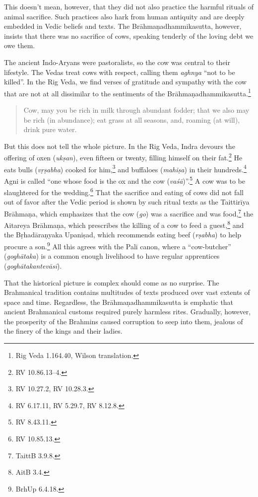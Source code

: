 \documentclass[12pt,openany]{book}%
\begin{document}
This doesn’t mean, however, that they did not also practice the harmful rituals of animal sacrifice. Such practices also hark from human antiquity and are deeply embedded in Vedic beliefs and texts. The \textsanskrit{Brāhmaṇadhammikasutta}, however, insists that there was no sacrifice of cows, speaking tenderly of the loving debt we owe them.

The ancient Indo-Aryans were pastoralists, so the cow was central to their lifestyle. The Vedas treat cows with respect, calling them \textit{aghnya} “not to be killed”. In the Rig Veda, we find verses of gratitude and sympathy with the cow that are not at all dissimilar to the sentiments of the \textsanskrit{Brāhmaṇadhammikasutta}.\footnote{Rig Veda 1.164.40, Wilson translation. }

\begin{quotation}%
Cow, may you be rich in milk through abundant fodder; that we also may be rich (in abundance); eat grass at all seasons, and, roaming (at will), drink pure water.

%
\end{quotation}

But this does not tell the whole picture. In the Rig Veda, Indra devours the offering of oxen (\textit{\textsanskrit{ukṣan}}), even fifteen or twenty, filling himself on their fat.\footnote{RV 10.86.13–4. } He eats bulls (\textit{\textsanskrit{vṛṣabha}}) cooked for him,\footnote{RV 10.27.2, RV 10.28.3. } and buffaloes (\textit{\textsanskrit{mahiṣa}}) in their hundreds.\footnote{RV 6.17.11, RV 5.29.7, RV 8.12.8. } Agni is called “one whose food is the ox and the cow (\textit{\textsanskrit{vaśā}})”.\footnote{RV 8.43.11. } A cow was to be slaughtered for the wedding.\footnote{RV 10.85.13. } That the sacrifice and eating of cows did not fall out of favor after the Vedic period is shown by such ritual texts as the \textsanskrit{Taittirīya} \textsanskrit{Brāhmaṇa}, which emphasizes that the cow (\textit{go}) was a sacrifice and was food,\footnote{TaittB 3.9.8. } the Aitareya \textsanskrit{Brāhmaṇa}, which prescribes the killing of a cow to feed a guest,\footnote{AitB 3.4. } and the \textsanskrit{Bṛhadāraṇyaka} \textsanskrit{Upaniṣad}, which recommends eating beef (\textit{\textsanskrit{rṣabha}}) to help procure a son.\footnote{BrhUp 6.4.18. } All this agrees with the Pali canon, where a “cow-butcher” (\textit{\textsanskrit{goghātaka}}) is a common enough livelihood to have regular apprentices (\textit{\textsanskrit{goghātakantevāsī}}).

That the historical picture is complex should come as no surprise. The Brahmanical tradition contains multitudes of texts produced over vast extents of space and time. Regardless, the \textsanskrit{Brāhmaṇadhammikasutta} is emphatic that ancient Brahmanical customs required purely harmless rites. Gradually, however, the prosperity of the Brahmins caused corruption to seep into them, jealous of the finery of the kings and their ladies.
\end{document}
